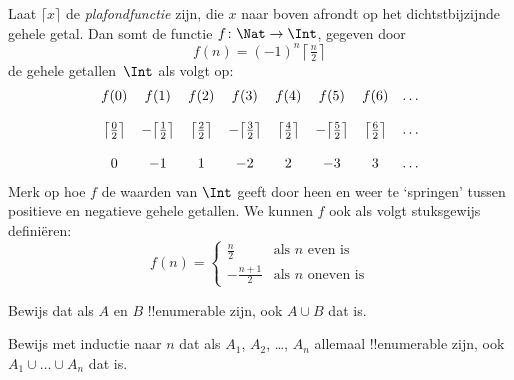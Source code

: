 \documentclass[../../../include/open-logic-section]{subfiles}
\begin{document}
\begin{ex}
Laat $\lceil x \rceil$ de \emph{plafondfunctie} zijn, die $x$ naar
boven afrondt op het dichtstbijzijnde gehele getal. Dan somt de functie
$f \colon \Nat \to \Int$, gegeven door
\[
  f(n) = (-1)^{n} \left\lceil\tfrac{n}{2}\right\rceil
\]
de gehele getallen~$\Int$ als volgt op:
\[
\begin{array}{c c c c c c c c}
f(0) & f(1) & f(2) & f(3) & f(4) & f(5) & f(6) & \dots \\ \\
\big\lceil \tfrac{0}{2} \big\rceil & -\big\lceil \tfrac{1}{2}\big\rceil &  \big\lceil \tfrac{2}{2} \big\rceil & -\big\lceil \tfrac{3}{2} \big\rceil & \big\lceil \tfrac{4}{2} \big\rceil  & -\big\lceil \tfrac{5}{2}\big\rceil & \big\lceil \tfrac{6}{2} \big\rceil & \dots \\ \\
0 & -1 & 1 & -2 & 2 & -3 & 3& \dots
\end{array}
\]
Merk op hoe $f$ de waarden van $\Int$ geeft door heen en weer te
‘springen’ tussen positieve en negatieve gehele getallen. We kunnen
$f$ ook als volgt stuksgewijs definiëren:
\[
f(n) = \begin{cases}
  \frac{n}{2} & \text{als $n$ even is}\\
  -\frac{n+1}{2} & \text{als $n$ oneven is}
  \end{cases}
\]
\end{ex}

\begin{prob}
Bewijs dat als $A$ en $B$ !!{enumerable} zijn, ook $A \cup B$ dat is.
\end{prob}

\begin{prob}
Bewijs met inductie naar $n$ dat als $A_1$, $A_2$, \dots, $A_n$
allemaal !!{enumerable} zijn, ook $A_1 \cup \dots \cup A_n$ dat is.
\end{prob}
\end{document}
